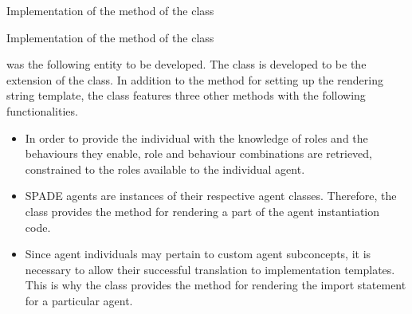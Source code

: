 \begin{listing}
    \caption{Implementation of the  method of the  class}
    \label{lst: mago-ag thing get_implementation}
\end{listing}

\begin{listing}
    \caption{Implementation of the  method of the  class}
    \label{lst: mago-ag thing write_implementation_to_file}
\end{listing}



%
was the following entity to be developed. The  class is developed to be the extension of the  class. In addition to the method for setting up the rendering string template, the  class features three other methods with the following functionalities.

\begin{itemize}
    \item
    In order to provide the  individual with the knowledge of roles and the behaviours they enable, role and behaviour combinations are retrieved, constrained to the roles available to the individual agent.

    \item
    \ac{SPADE} agents are instances of their respective agent classes. Therefore, the  class provides the method for rendering a part of the agent instantiation code.

    \item
    Since agent individuals may pertain to custom agent subconcepts, it is necessary to allow their successful translation to implementation templates. This is why the  class provides the method for rendering the import statement for a particular agent.
\end{itemize}

